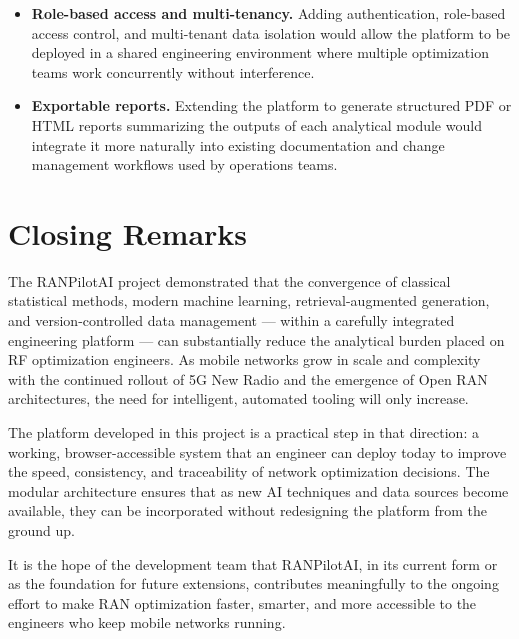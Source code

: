 \begin{itemize}
    \item \textbf{Role-based access and multi-tenancy.} Adding authentication, role-based access control, and multi-tenant data isolation would allow the platform to be deployed in a shared engineering environment where multiple optimization teams work concurrently without interference.

    \item \textbf{Exportable reports.} Extending the platform to generate structured PDF or HTML reports summarizing the outputs of each analytical module would integrate it more naturally into existing documentation and change management workflows used by operations teams.

\end{itemize}

\section{Closing Remarks}

The RANPilotAI project demonstrated that the convergence of classical statistical methods, modern machine learning, retrieval-augmented generation, and version-controlled data management — within a carefully integrated engineering platform — can substantially reduce the analytical burden placed on RF optimization engineers. As mobile networks grow in scale and complexity with the continued rollout of 5G New Radio and the emergence of Open RAN architectures, the need for intelligent, automated tooling will only increase.

The platform developed in this project is a practical step in that direction: a working, browser-accessible system that an engineer can deploy today to improve the speed, consistency, and traceability of network optimization decisions. The modular architecture ensures that as new AI techniques and data sources become available, they can be incorporated without redesigning the platform from the ground up.

It is the hope of the development team that RANPilotAI, in its current form or as the foundation for future extensions, contributes meaningfully to the ongoing effort to make RAN optimization faster, smarter, and more accessible to the engineers who keep mobile networks running.
